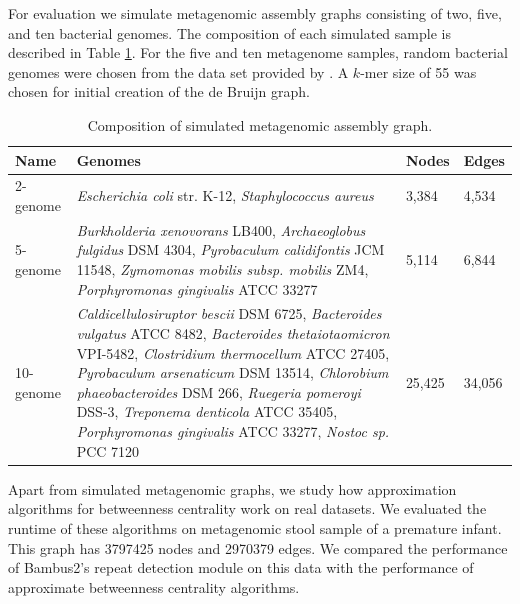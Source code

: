 \documentclass[runningheads,a4paper]{llncs}
\begin{document}
For evaluation we simulate metagenomic assembly graphs consisting of two, five, and ten bacterial genomes.
The composition of each simulated sample is described in Table \ref{tab:composition}.
For the five and ten metagenome samples, random bacterial genomes were chosen from the data set provided by \cite{shakya2013comparative}.
A $k$-mer size of 55 was chosen for initial creation of the de Bruijn graph.

\begin{table}[h]
\centering
\caption[]{Composition of simulated metagenomic assembly graph.}
\begin{tabularx}{\linewidth}{|l|X|l|l|}
\hline
\textbf{Name} & \textbf{Genomes} & \textbf{Nodes} & \textbf{Edges} \\
\hline
2-genome & \textit{Escherichia coli} str. K-12, \textit{Staphylococcus aureus}  & 3,384 & 4,534 \\
\hline
5-genome & \textit{Burkholderia xenovorans} LB400, \textit{Archaeoglobus fulgidus} DSM 4304,  \textit{Pyrobaculum calidifontis} JCM 11548, \textit{Zymomonas mobilis subsp. mobilis} ZM4, \textit{Porphyromonas gingivalis} ATCC 33277 & 5,114 & 6,844  \\
\hline
10-genome  & \textit{Caldicellulosiruptor bescii} DSM 6725, \textit{Bacteroides vulgatus} ATCC 8482, 
 \textit{Bacteroides thetaiotaomicron} VPI-5482, \textit{Clostridium thermocellum} ATCC 27405, 
 \textit{Pyrobaculum arsenaticum} DSM 13514, \textit{Chlorobium phaeobacteroides} DSM 266, 
 \textit{Ruegeria pomeroyi} DSS-3, \textit{Treponema denticola} ATCC 35405, 
 \textit{Porphyromonas gingivalis} ATCC 33277, \textit{Nostoc sp.} PCC 7120  & 25,425 & 34,056\\
\hline 
\end{tabularx}
\label{tab:composition}
\end{table}

Apart from simulated metagenomic graphs, we study how approximation algorithms for betweenness centrality work on real datasets. We evaluated the runtime  of these algorithms on metagenomic stool sample of a premature infant\cite{morowitz2011strain}. This graph has 3797425 nodes and 2970379 edges. We compared the performance of Bambus2's repeat detection module on this data with the performance of approximate betweenness centrality algorithms.  
\end{document}
